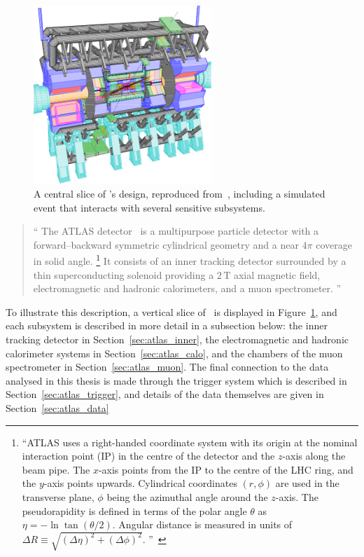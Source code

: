 \begin{figure}[tp]
\centering
\includegraphics[width=0.6\textwidth]{figures/atlas_cutaway_volume_1.pdf}
\caption[
A central slice of \atlas's design
]{%
A central slice of \atlas's design, reproduced from~\cite{atlas1999design1},
including a simulated event that interacts with several sensitive subsystems.
}
\label{fig:atlas_cutaway}
\end{figure}

\begin{quote}
``%
The ATLAS detector~\cite{atlas2008experiment} is a multipurpose particle
detector with a forward--backward symmetric cylindrical geometry and a near
$4\pi$ coverage in solid angle.%
\footnote{%
``ATLAS uses a right-handed coordinate system with its origin at the nominal
interaction point (IP) in the centre of the detector and the $z$-axis along the
beam pipe.
The $x$-axis points from the IP to the centre of the LHC ring, and the $y$-axis
points upwards.
Cylindrical coordinates $(r,\phi)$ are used in the transverse plane, $\phi$
being the azimuthal angle around the $z$-axis.
The pseudorapidity is defined in terms of the polar angle $\theta$ as
$\eta = -\ln \tan(\theta/2)$.
Angular distance is measured in units of
$\Delta R \equiv \sqrt{(\Delta\eta)^{2} + (\Delta\phi)^{2}}$.%
''\footnotemark~\cite{atlas2022searches}%
}
It consists of an inner tracking detector surrounded by a thin superconducting
solenoid providing a $2\,\mathrm{T}$ axial magnetic field, electromagnetic and
hadronic calorimeters, and a muon spectrometer.%
''~\cite{atlas2022searches}
\end{quote}
To illustrate this description, a vertical slice of \atlas\ is displayed in
Figure~\ref{fig:atlas_cutaway}, and each subsystem is described in more detail
in a subsection below:
the inner tracking detector in Section~\ref{sec:atlas_inner},
the electromagnetic and hadronic calorimeter systems in
Section~\ref{sec:atlas_calo},
and
the chambers of the muon spectrometer in Section~\ref{sec:atlas_muon}.
The final connection to the data analysed in this thesis is made through the
trigger system which is described in Section~\ref{sec:atlas_trigger},
and details of the data themselves are given in
Section~\ref{sec:atlas_data}

